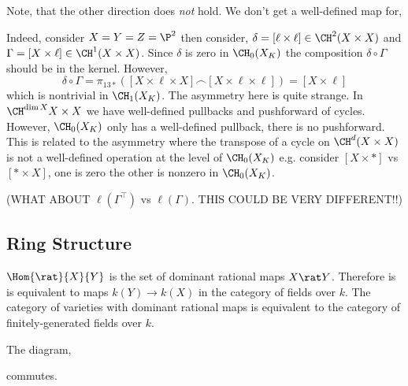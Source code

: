 \documentclass[12pt]{article}
\begin{document}
\begin{rmk}
Note, that the other direction does \textit{not} hold. We don't get a well-defined map for,
\begin{center}
\end{center}
Indeed, consider $X = Y = Z = \P^2$ then consider, $\delta = [\ell \times \ell] \in \CH^2(X \times X)$ and $\Gamma = [X \times \ell] \in \CH^1(X \times X)$. Since $\delta$ is zero in $\CH_0(X_K)$ the composition $\delta \circ \Gamma$ should be in the kernel. However, 
\[ \delta \circ \Gamma = \pi_{13*}([X \times \ell \times X] \frown [X \times \ell \times \ell]) = [X \times \ell] \]
which is nontrivial in $\CH_1(X_K)$. The asymmetry here is quite strange. In $\CH^{\dim{X}}{X \times X}$ we have well-defined pullbacks and pushforward of cycles. However, $\CH_0(X_K)$ only has a well-defined pullback, there is no pushforward. This is related to the asymmetry where the transpose of a cycle on $\CH^{d}(X \times X)$ is not a well-defined operation at the level of $\CH_0(X_K)$ e.g. consider $[X \times *]$ vs $[* \times X]$, one is zero the other is nonzero in $\CH_0(X_K)$. 
\end{rmk}

(WHAT ABOUT $\ell(\Gamma^\top)$ vs $\ell(\Gamma)$. THIS COULD BE VERY DIFFERENT!!)

\subsection{Ring Structure}

\begin{rmk}
$\Hom{\rat}{X}{Y}$ is the set of dominant rational maps $X \rat Y$. Therefore is is equivalent to maps $k(Y) \to k(X)$ in the category of fields over $k$. The category of varieties with dominant rational maps is equivalent to the category of finitely-generated fields over $k$.
\end{rmk}

\begin{prop}
The diagram,
\begin{center}
\end{center}
commutes.
\end{prop}
\end{document}
